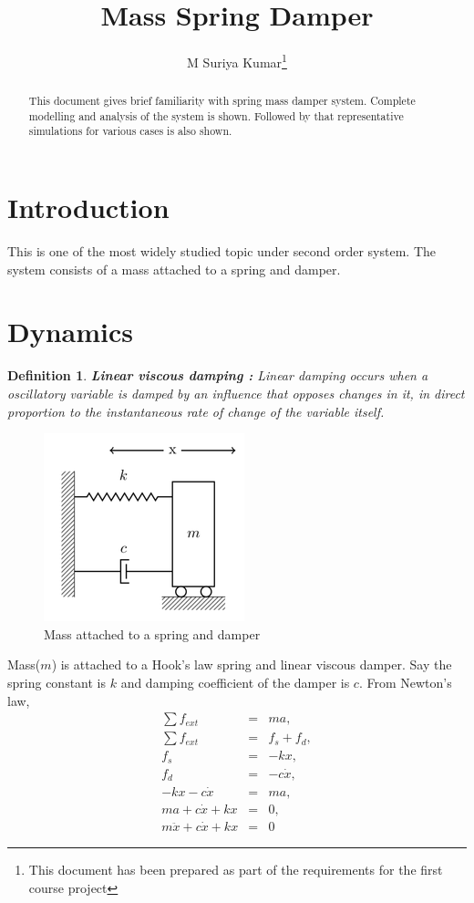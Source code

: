 \documentclass[11pt]{article}
\title{Mass Spring Damper}
\author{M Suriya Kumar\thanks{This document has been prepared as part of the requirements for the first course project}}
\date{}
\newtheorem*{defn}{Definition}
\begin{document}
\maketitle
\begin{abstract}
This document gives brief familiarity with spring mass damper system. Complete modelling and analysis of 
the system is shown. Followed by that representative simulations for various cases is also shown.
\end{abstract}
\section{Introduction}
This is one of the most widely studied topic under second order system. The system consists of a mass attached to a spring and damper.  

\section{Dynamics}
\begin{defn}
\hfill \break
\textbf{Linear viscous damping :} Linear damping occurs when a oscillatory variable is damped 
by an influence that opposes changes in it, in direct proportion to the instantaneous rate of change 
of the variable itself.
\end{defn}

\begin{figure}[H]
	\begin{center}
	\includegraphics[scale=0.8]{spring_mass_damper.png}
	\caption{Mass attached to a spring and damper}
	\centering
	\end{center}
\end{figure}

Mass($m$) is attached to a Hook's law spring and linear viscous damper. Say the spring constant 
is $k$ and damping coefficient of the damper is $c$.
\hfil \break
From Newton's law, 
\begin{eqnarray*}
\sum f_{ext} &=& ma, \\
\sum f_{ext} &=& f_s + f_d, \\
f_s &=& -kx, 	\\
f_d &=& -c\dot{x}, \\
-kx - c\dot{x} &=& ma, \\
ma + c\dot{x} + kx &=& 0, \\
m\ddot{x} + c\dot{x} + kx &=& 0
\end{eqnarray*}
\end{document}
